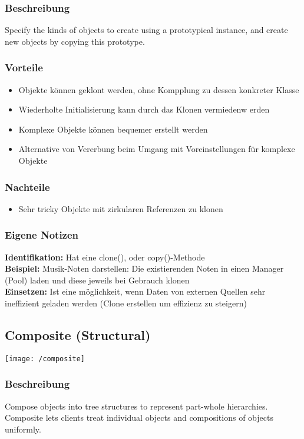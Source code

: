 \subsubsection{Beschreibung}
Specify the kinds of objects to create using a prototypical instance, and create new objects by copying this prototype.
\subsubsection{Vorteile}
\begin{itemize}[topsep=0pt]
    \itemsep -0.4em
    \item Objekte können geklont werden, ohne Kompplung zu dessen konkreter Klasse
    \item Wiederholte Initialisierung kann durch das Klonen vermiedenw erden
    \item Komplexe Objekte können bequemer erstellt werden
    \item Alternative von Vererbung beim Umgang mit Voreinstellungen für komplexe Objekte
\end{itemize}
\subsubsection{Nachteile}
\begin{itemize}[topsep=0pt]
    \itemsep -0.4em
    \item Sehr tricky Objekte mit zirkularen Referenzen zu klonen
\end{itemize}
\subsubsection{Eigene Notizen}
\textbf{Identifikation:} Hat eine clone(), oder copy()-Methode\\
\textbf{Beispiel:} Musik-Noten darstellen: Die existierenden Noten in einen Manager (Pool) laden und diese jeweils bei Gebrauch klonen\\
\textbf{Einsetzen:} Ist eine möglichkeit, wenn Daten von externen Quellen sehr ineffizient geladen werden (Clone erstellen um effizienz zu steigern)

\subsection{Composite (Structural)}
\texttt{[image: /composite]}
\subsubsection{Beschreibung}
Compose objects into tree structures to represent part-whole hierarchies. Composite lets clients treat individual objects and compositions of objects uniformly.
